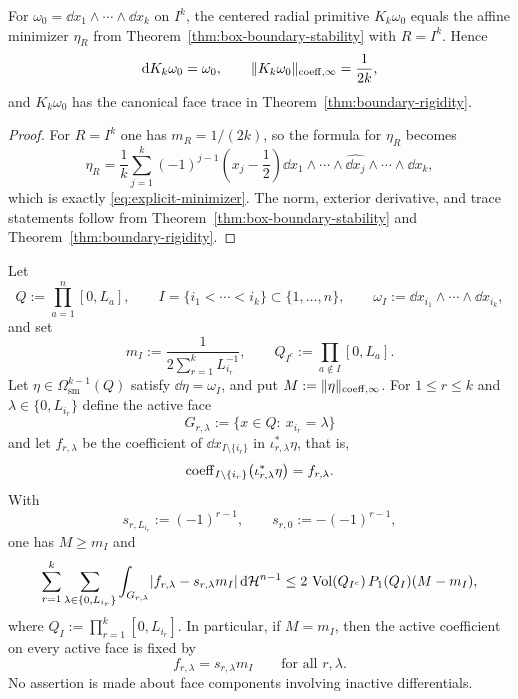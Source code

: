 \begin{corollary}
\label{cor:explicit-minimizer}
For $\omega_0=\dd x_1\wedge\cdots\wedge\dd x_k$ on $I^k$, the centered
radial primitive $K_k\omega_0$ equals the affine minimizer $\eta_R$ from
Theorem~\ref{thm:box-boundary-stability} with $R=I^k$. Hence
\[
\mathrm{d} K_k\omega_0=\omega_0,
\qquad
\lVert K_k\omega_0 \rVert_{\mathrm{coeff},\infty}=\frac{1}{2k},
\]
and $K_k\omega_0$ has the canonical face trace in
Theorem~\ref{thm:boundary-rigidity}.
\end{corollary}

\begin{proof}
For $R=I^k$ one has $m_R=1/(2k)$, so the formula for $\eta_R$ becomes
\[
\eta_R
=
\frac1k\sum_{j=1}^k(-1)^{j-1}\left(x_j-\frac12\right)
\dd x_1\wedge\cdots\wedge\widehat{\dd x_j}\wedge\cdots\wedge\dd x_k,
\]
which is exactly \eqref{eq:explicit-minimizer}. The norm, exterior derivative,
and trace statements follow from Theorem~\ref{thm:box-boundary-stability} and
Theorem~\ref{thm:boundary-rigidity}.
\end{proof}

\begin{theorem}
\label{thm:sliced-active-readout}
Let
\[
Q:=\prod_{a=1}^n[0,L_a],
\qquad
I=\{i_1<\cdots<i_k\}\subset\{1,\dots,n\},
\qquad
\omega_I:=\dd x_{i_1}\wedge\cdots\wedge\dd x_{i_k},
\]
and set
\[
m_I:=\frac{1}{2\sum_{r=1}^kL_{i_r}^{-1}},
\qquad
Q_{I^c}:=\prod_{a\notin I}[0,L_a].
\]
Let $\eta\in\Omega^{k-1}_{\mathrm{sm}}(Q)$ satisfy $\dd\eta=\omega_I$, and
put $M:=\lVert \eta \rVert_{\mathrm{coeff},\infty}$. For
$1\le r\le k$ and $\lambda\in\{0,L_{i_r}\}$ define the active face
\[
G_{r,\lambda}:=\{x\in Q:\ x_{i_r}=\lambda\}
\]
and let $f_{r,\lambda}$ be the coefficient of
$\dd x_{I\setminus\{i_r\}}$ in $\iota_{r,\lambda}^\ast\eta$, that is,
\[
\mathrm{coeff}_{I\setminus\{i_r\}}\bigl(\iota_{r,\lambda}^\ast\eta\bigr)
=f_{r,\lambda}.
\]
With
\[
s_{r,L_{i_r}}:=(-1)^{r-1},
\qquad
s_{r,0}:=-(-1)^{r-1},
\]
one has $M\ge m_I$ and
\begin{equation}
\label{eq:sliced-active-stability}
\sum_{r=1}^k\sum_{\lambda\in\{0,L_{i_r}\}}
\int_{G_{r,\lambda}}
\lvert f_{r,\lambda}-s_{r,\lambda}m_I \rvert\,\mathrm{d}\mathcal{H}^{n-1}
\le
2\,\operatorname{Vol}(Q_{I^c})\,P_1(Q_I)(M-m_I),
\end{equation}
where $Q_I:=\prod_{r=1}^k[0,L_{i_r}]$. In particular, if $M=m_I$, then the
active coefficient on every active face is fixed by
\[
f_{r,\lambda}=s_{r,\lambda}m_I
\qquad
\text{for all }r,\lambda.
\]
No assertion is made about face components involving inactive differentials.
\end{theorem}

